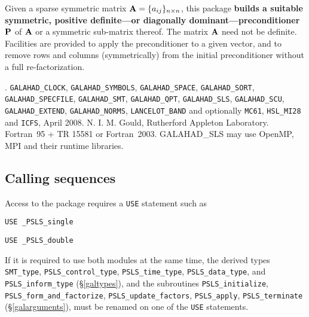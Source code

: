 \documentclass{galahad}
\newcommand{\packagename}{PSLS}
\newcommand{\fullpackagename}{\libraryname\_\-\packagename}
\begin{document}
\galheader


\galsummary

Given a sparse symmetric matrix ${\mathbf{A}} = \{ a_{ij} \}_{n \times n}$, this package
{\bf builds a suitable symmetric, positive definite---or 
diagonally dominant---preconditioner ${\mathbf{P}}$} of ${\mathbf{A}}$ or a symmetric 
sub-matrix thereof. The matrix ${\mathbf{A}}$ need not be definite. Facilities
are provided to apply the preconditioner to a given vector, and to
remove rows and columns (symmetrically) from the initial preconditioner
without a full re-factorization.


\galattributes
\galversions{\tt  \fullpackagename\_single, \fullpackagename\_double}.
\galcalls
{\tt GALAHAD\_CLOCK},
{\tt GALAHAD\-\_SYMBOLS},
{\tt GALAHAD\_SPACE},
{\tt GALAHAD\_\-SORT},
{\tt GALAHAD\_SPECFILE},
{\tt GALAHAD\_SMT},
{\tt GALAHAD\_QPT},
{\tt GALAHAD\_SLS},
{\tt GALA\-HAD\_SCU},
{\tt GALAHAD\_EXTEND},
{\tt GALAHAD\_NORMS},
{\tt LANCELOT\_BAND}
and optionally
{\tt MC61},
{\tt HSL\_\-MI28} and
{\tt ICFS},
\galdate April 2008.
\galorigin N. I. M. Gould, Rutherford Appleton Laboratory.
\gallanguage Fortran~95 + TR 15581 or Fortran~2003.
\galparallelism GALAHAD\_SLS may use OpenMP, MPI and their runtime libraries.


\galhowto

\subsection{Calling sequences}

Access to the package requires a {\tt USE} statement such as

\medskip{}

\hskip0.5in {\tt USE \fullpackagename\_single}

\medskip{}

\hskip0.5in {\tt USE  \fullpackagename\_double}

\medskip

If it is required to use both modules at the same time, the derived types
{\tt SMT\_type},
{\tt \packagename\_control\_type},
{\tt \packagename\_time\-\_type},
{\tt \packagename\_data\-\_type}, and
{\tt \packagename\_inform\_type}
(\S\ref{galtypes}),
and the subroutines
{\tt \packagename\_initialize},
{\tt \packagename\-\_form\_and\_fact\-orize},
{\tt \packagename\-\_update\_factors},
{\tt \packagename\_apply},
{\tt \packagename\_terminate}
(\S\ref{galarguments}),
must be renamed on one of the {\tt USE} statements.
\end{document}
